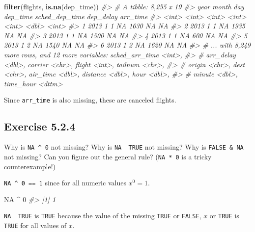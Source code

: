 \documentclass[]{book}
\newenvironment{Shaded}{\begin{snugshade}}{\end{snugshade}}
\newcommand{\CommentTok}[1]{\textcolor[rgb]{0.56,0.35,0.01}{\textit{#1}}}
\newcommand{\DecValTok}[1]{\textcolor[rgb]{0.00,0.00,0.81}{#1}}
\newcommand{\KeywordTok}[1]{\textcolor[rgb]{0.13,0.29,0.53}{\textbf{#1}}}
\newcommand{\NormalTok}[1]{#1}
\newcommand{\OperatorTok}[1]{\textcolor[rgb]{0.81,0.36,0.00}{\textbf{#1}}}
\newcommand{\OtherTok}[1]{\textcolor[rgb]{0.56,0.35,0.01}{#1}}
\newcommand{\StringTok}[1]{\textcolor[rgb]{0.31,0.60,0.02}{#1}}
\theoremstyle{plain}
\theoremstyle{remark}
\theoremstyle{definition}
\theoremstyle{definition}
\theoremstyle{definition}
\theoremstyle{remark}
\begin{document}
\begin{Shaded}
\begin{Highlighting}[]
\KeywordTok{filter}\NormalTok{(flights, }\KeywordTok{is.na}\NormalTok{(dep_time))}
\CommentTok{#> # A tibble: 8,255 x 19}
\CommentTok{#>    year month   day dep_time sched_dep_time dep_delay arr_time}
\CommentTok{#>   <int> <int> <int>    <int>          <int>     <dbl>    <int>}
\CommentTok{#> 1  2013     1     1       NA           1630        NA       NA}
\CommentTok{#> 2  2013     1     1       NA           1935        NA       NA}
\CommentTok{#> 3  2013     1     1       NA           1500        NA       NA}
\CommentTok{#> 4  2013     1     1       NA            600        NA       NA}
\CommentTok{#> 5  2013     1     2       NA           1540        NA       NA}
\CommentTok{#> 6  2013     1     2       NA           1620        NA       NA}
\CommentTok{#> # ... with 8,249 more rows, and 12 more variables: sched_arr_time <int>,}
\CommentTok{#> #   arr_delay <dbl>, carrier <chr>, flight <int>, tailnum <chr>,}
\CommentTok{#> #   origin <chr>, dest <chr>, air_time <dbl>, distance <dbl>, hour <dbl>,}
\CommentTok{#> #   minute <dbl>, time_hour <dttm>}
\end{Highlighting}
\end{Shaded}

Since \texttt{arr\_time} is also missing, these are canceled flights.

\hypertarget{exercise-5.2.4}{%
\subsection*{\texorpdfstring{Exercise
{5.2.4}}{Exercise 5.2.4}}\label{exercise-5.2.4}}

Why is \texttt{NA\ \^{}\ 0} not missing? Why is
\texttt{NA\ \textbar{}\ TRUE} not missing? Why is \texttt{FALSE\ \&\ NA}
not missing? Can you figure out the general rule? (\texttt{NA\ *\ 0} is
a tricky counterexample!)

\texttt{NA\ \^{}\ 0\ ==\ 1} since for all numeric values \(x ^ 0 = 1\).

\begin{Shaded}
\begin{Highlighting}[]
\OtherTok{NA} \OperatorTok{^}\StringTok{ }\DecValTok{0}
\CommentTok{#> [1] 1}
\end{Highlighting}
\end{Shaded}

\texttt{NA\ \textbar{}\ TRUE} is \texttt{TRUE} because the value of the
missing \texttt{TRUE} or \texttt{FALSE}, \(x\) or \texttt{TRUE} is
\texttt{TRUE} for all values of \(x\).
\end{document}
